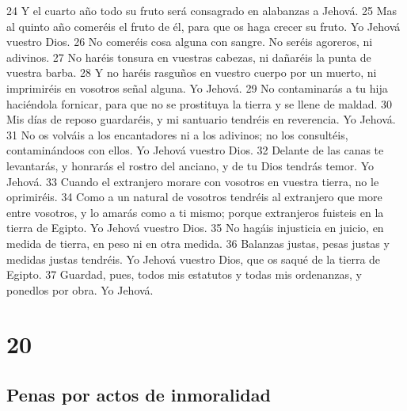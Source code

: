 24 Y el cuarto año todo su fruto será consagrado en alabanzas a Jehová.
25 Mas al quinto año comeréis el fruto de él, para que os haga crecer su fruto. Yo Jehová vuestro Dios.
26 No comeréis cosa alguna con sangre. No seréis agoreros, ni adivinos.
27 No haréis tonsura en vuestras cabezas, ni dañaréis la punta de vuestra barba.
28 Y no haréis rasguños en vuestro cuerpo por un muerto, ni imprimiréis en vosotros señal alguna. Yo Jehová.
29 No contaminarás a tu hija haciéndola fornicar,  para que no se prostituya la tierra y se llene de maldad.
30 Mis días de reposo guardaréis, y mi santuario tendréis en reverencia. Yo Jehová.
31 No os volváis a los encantadores ni a los adivinos; no los consultéis, contaminándoos con ellos. Yo Jehová vuestro Dios.
32 Delante de las canas te levantarás, y honrarás el rostro del anciano, y de tu Dios tendrás temor. Yo Jehová.
33 Cuando el extranjero morare con vosotros en vuestra tierra, no le oprimiréis.
34 Como a un natural de vosotros tendréis al extranjero que more entre vosotros, y lo amarás como a ti mismo; porque extranjeros fuisteis en la tierra de Egipto. Yo Jehová vuestro Dios.
35 No hagáis injusticia en juicio, en medida de tierra, en peso ni en otra medida.
36 Balanzas justas, pesas justas y medidas justas tendréis. Yo Jehová vuestro Dios, que os saqué de la tierra de Egipto.
37 Guardad, pues, todos mis estatutos y todas mis ordenanzas, y ponedlos por obra. Yo Jehová. 

\chapter{20}

\section{Penas por actos de inmoralidad}

